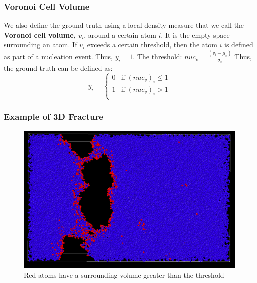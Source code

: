 \frame
{
\frametitle{Voronoi Cell Volume}
\begin{block}{}
We also define the ground truth using a local density measure that we call the \textbf{Voronoi cell volume, $v_i$}, around a certain atom $i$. It is the empty space surrounding an atom.
\newline\newline
If $v_i$ exceeds a certain threshold, then the atom $i$ is defined as part of a nucleation event. Thus, $y_i = 1$.
\newline\newline
The threshold:
\centering $nuc_v = \frac{(v_i - \mu_v)}{\sigma_v}$
Thus, the ground truth can be defined as:
    \[
    y_i = \begin{cases}
      0 & \text{if }(nuc_v)_i \le 1 \\
      1 & \text{if }(nuc_v)_i > 1 \\
    \end{cases} 
    \]
\end{block}
}

\frame
{
  \frametitle{Example of 3D Fracture}
  \begin{block}{}

\begin{figure}[h]
				\centering
				\includegraphics[width=.7\textwidth]{volcolor.png}
				 \caption{Red atoms have a surrounding volume greater than the threshold}
\end{figure}
 
    \end{block}
}